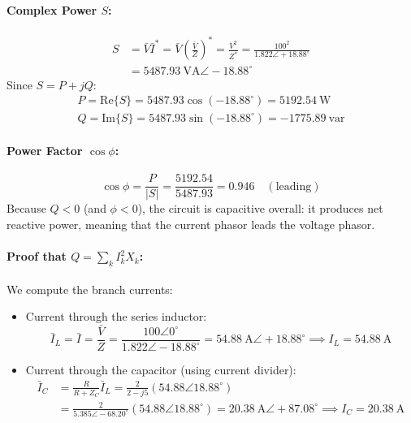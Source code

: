 \paragraph{Complex Power $S$:}
\begin{align}
    S &= \bar{V} \bar{I}^* = \bar{V} \left(\frac{\bar{V}}{Z}\right)^* = \frac{V^2}{Z^*} = \frac{100^2}{1.822\angle +18.88^\circ} \nonumber\\
      &= 5487.93\ \text{VA} \angle -18.88^\circ
\end{align}
Since $S = P + jQ$:
\begin{align}
    \boxed{P = \text{Re}\{S\} = 5487.93 \cos(-18.88^\circ) = 5192.54\ \text{W}} \\
    \boxed{Q = \text{Im}\{S\} = 5487.93 \sin(-18.88^\circ) = -1775.89\ \text{var}}
\end{align}

\paragraph{Power Factor $\cos\phi$:}
\begin{equation}
    \boxed{\cos\phi = \frac{P}{|S|} = \frac{5192.54}{5487.93} = 0.946\quad (\text{leading})}
\end{equation}
Because $Q < 0$ (and $\phi < 0$), the circuit is capacitive overall: it produces net reactive power, meaning that the current phasor leads the voltage phasor.

\paragraph{Proof that $Q = \sum_k I_k^2 X_k$:}
We compute the branch currents:
\begin{itemize}
    \item Current through the series inductor:
    \[
    \bar{I}_L = \bar{I} = \frac{\bar{V}}{Z} = \frac{100\angle 0^\circ}{1.822\angle -18.88^\circ} = 54.88\ \text{A} \angle +18.88^\circ \implies I_L = 54.88\ \text{A}
    \]
    \item Current through the capacitor (using current divider):
    \begin{align*}
        \bar{I}_C &= \frac{R}{R + Z_C} \bar{I}_L = \frac{2}{2 - j5} (54.88\angle 18.88^\circ) \\
                  &= \frac{2}{5.385\angle -68.20^\circ} (54.88\angle 18.88^\circ) = 20.38\ \text{A} \angle +87.08^\circ \implies I_C = 20.38\ \text{A}
    \end{align*}
\end{itemize}


